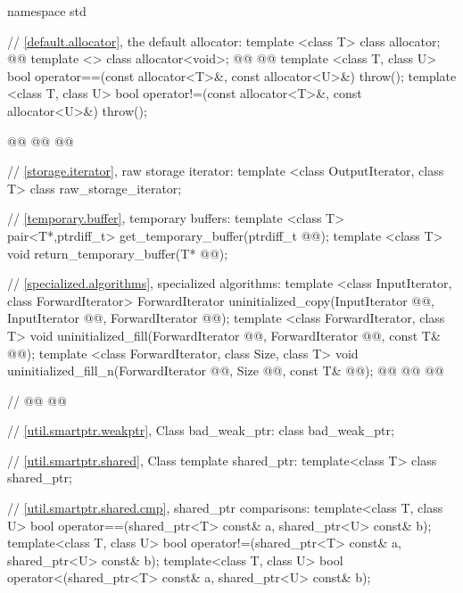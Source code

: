 \documentclass[american,twoside]{book}
\begin{document}
%
\begin{codeblock}
namespace std {
  // \ref{default.allocator}, the default allocator: 
  template <class T> class allocator; @@
  template <> class allocator<void>;
  @@
    @@
  template <class T, class U>
    bool operator==(const allocator<T>&, const allocator<U>&) throw();
  template <class T, class U>
    bool operator!=(const allocator<T>&, const allocator<U>&) throw();

  @@
  @@
    @@

  // \ref{storage.iterator}, raw storage iterator:
  template <class OutputIterator, class T> class raw_storage_iterator;

  // \ref{temporary.buffer}, temporary buffers:
  template <class T>
    pair<T*,ptrdiff_t> get_temporary_buffer(ptrdiff_t @@);
  template <class T>
    void return_temporary_buffer(T* @@);

  // \ref{specialized.algorithms}, specialized algorithms:
  template <class InputIterator, class ForwardIterator>
    ForwardIterator
      uninitialized_copy(InputIterator @@, InputIterator @@,
                         ForwardIterator @@);
  template <class ForwardIterator, class T>
    void uninitialized_fill(ForwardIterator @@, ForwardIterator @@,
                            const T& @@);
  template <class ForwardIterator, class Size, class T>
    void uninitialized_fill_n(ForwardIterator @@, Size @@, const T& @@);
  @@
  @@
  @@

  // 
  @@
  @@

  // \ref{util.smartptr.weakptr}, Class bad_weak_ptr:
  class bad_weak_ptr;

  // \ref{util.smartptr.shared}, Class template shared_ptr:
  template<class T> class shared_ptr;

  // \ref{util.smartptr.shared.cmp}, shared_ptr comparisons:
  template<class T, class U>
    bool operator==(shared_ptr<T> const& a, shared_ptr<U> const& b);
  template<class T, class U>
    bool operator!=(shared_ptr<T> const& a, shared_ptr<U> const& b);
  template<class T, class U>
    bool operator<(shared_ptr<T> const& a, shared_ptr<U> const& b);

}
\end{codeblock}
\end{document}
